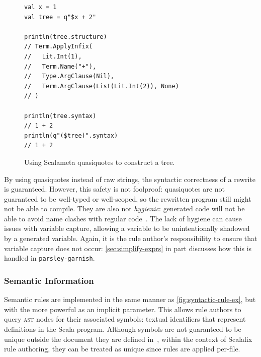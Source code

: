 \documentclass[../../main.tex]{subfiles}
\begin{document}
\begin{figure}[htbp]
\begin{verbatim}
val x = 1
val tree = q"$x + 2"

println(tree.structure)
// Term.ApplyInfix(
//   Lit.Int(1),
//   Term.Name("+"),
//   Type.ArgClause(Nil),
//   Term.ArgClause(List(Lit.Int(2)), None)
// )

println(tree.syntax)
// 1 + 2
println(q"($tree)".syntax)
// 1 + 2
\end{verbatim}
\caption{Using Scalameta quasiquotes to construct a tree.}
\label{fig:quasiquote-ex}
\end{figure}

\noindent %
By using quasiquotes instead of raw strings, the syntactic correctness of a rewrite is guaranteed.
However, this safety is not foolproof: quasiquotes are not guaranteed to be well-typed or well-scoped, so the rewritten program still might not be able to compile.
They are also not \emph{hygienic}: generated code will not be able to avoid name clashes with regular code~\cite{burmako_scalameta_2017}.
The lack of hygiene can cause issues with variable capture, allowing a variable to be unintentionally shadowed by a generated variable.
Again, it is the rule author's responsibility to ensure that variable capture does not occur: \cref{sec:simplify-exprs} in part discusses how this is handled in \texttt{parsley-garnish}.

\subsubsection{Semantic Information}
Semantic rules are implemented in the same manner as \cref{fig:syntactic-rule-ex}, but with the more powerful  as an implicit parameter.
This allows rule authors to query \textsc{ast} nodes for their associated symbols: textual identifiers that represent definitions in the Scala program.
Although symbols are not guaranteed to be unique outside the document they are defined in~\cite{scalameta_semanticdb_spec_2023}, within the context of Scalafix rule authoring, they can be treated as unique since rules are applied per-file.
\end{document}
